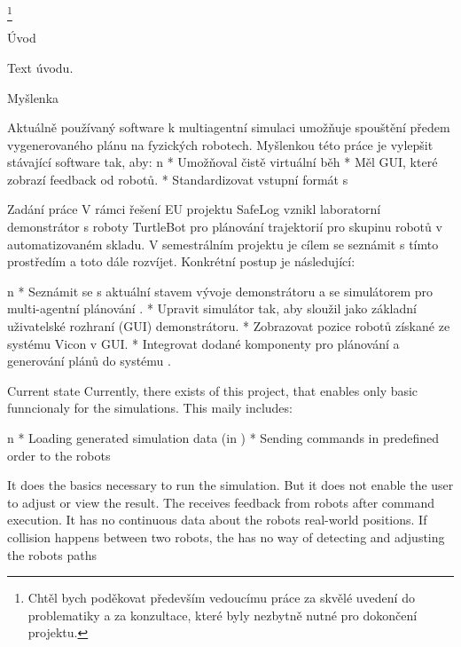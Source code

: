 \thanks {Chtěl bych poděkovat především vedoucímu práce \kulich za skvělé uvedení do problematiky a za konzultace, které byly nezbytně nutné pro dokončení projektu.}
\makefront



\chap Úvod


Text úvodu.

\sec Myšlenka

Aktuálně používaný software k multiagentní simulaci umožňuje spouštění předem vygenerovaného plánu na fyzických robotech. Myšlenkou této práce je vylepšit stávající software tak, aby:
\begitems \style n
    * Umožňoval čistě virtuální běh
    * Měl GUI, které zobrazí feedback od robotů.
    * Standardizovat vstupní formát s \mapfIR
\enditems

\sec Zadání práce
V rámci řešení EU projektu SafeLog vznikl laboratorní demonstrátor s roboty TurtleBot pro plánování trajektorií pro skupinu robotů v automatizovaném skladu. V semestrálním projektu je cílem se seznámit s tímto prostředím a toto dále rozvíjet. Konkrétní postup je následující:


\begitems \style n
    * Seznámit se s aktuální stavem vývoje demonstrátoru a se simulátorem pro multi-agentní plánování \mapfIR.
    * Upravit simulátor tak, aby sloužil jako základní uživatelské rozhraní (GUI) demonstrátoru.
    * Zobrazovat pozice robotů získané ze systému Vicon v GUI.
    * Integrovat dodané komponenty pro plánování a generování plánů do systému .
\enditems

\sec Current state
Currently, there exists {\oldRepo} of this project, that enables only basic funncionaly for the simulations. This maily includes:

\begitems \style n
    * Loading generated simulation data (in {\oldFormat})
    * Sending commands in predefined order to the robots
\enditems

It does the basics necessary to run the simulation. But it does not enable the user to adjust or view the result.
The {\oldRepo} receives feedback from robots after command execution. It has no continuous data about the robots real-world positions. If collision happens between two robots, the {\oldRepo} has no way of detecting and adjusting the robots paths

